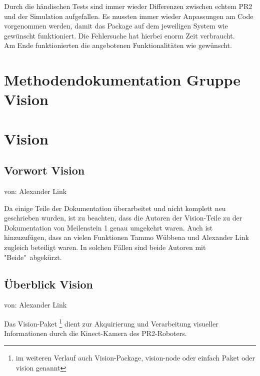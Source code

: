 \documentclass{suturo}
\makeatletter
\newcommand{\chapterauthor}[1]{%
  {\parindent0pt\vspace*{-27pt}%
  \linespread{0}\small\begin{flushright}von: #1\end{flushright}%
  \par\nobreak\vspace*{0pt}}
  \@afterheading%
}
\makeatother
\begin{document}
Durch die händischen Tests sind immer wieder Differenzen zwischen echtem PR2 und der Simulation aufgefallen. Es mussten immer wieder Anpassungen am Code vorgenommen werden, damit das Package auf dem jeweiligen System wie gewünscht funktioniert. Die Fehlersuche hat hierbei enorm Zeit verbraucht. \\

Am Ende funktionierten die angebotenen Funktionalitäten wie gewünscht.\\

\newpage

\section*{Methodendokumentation Gruppe Vision}

\section{Vision}
\subsection{Vorwort Vision}
\chapterauthor{Alexander Link}
Da einige Teile der Dokumentation überarbeitet und nicht komplett neu geschrieben wurden, ist zu beachten, dass die Autoren der Vision-Teile zu der Dokumentation von Meilenstein 1 genau umgekehrt waren. Auch ist hinzuzufügen, dass an vielen Funktionen Tammo Wübbena und Alexander Link zugleich beteiligt waren. In solchen Fällen sind beide Autoren mit "Beide"\ abgekürzt.

\subsection{Überblick Vision}
\chapterauthor{Alexander Link}
Das Vision-Paket \footnote{im weiteren Verlauf auch Vision-Package, vision-node oder einfach Paket oder vision genannt} dient zur Akquirierung und Verarbeitung visueller Informationen durch die Kinect-Kamera des PR2-Roboters.

\begin{figure}[!htb]
\end{figure}
      
\end{document}
